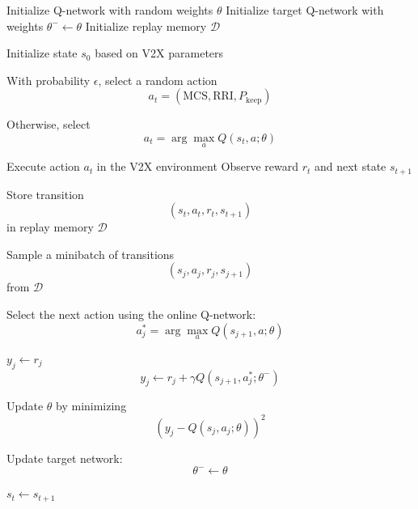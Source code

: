 \begin{algorithm}[H]
\caption{Double Deep Q-Learning for Adaptive Resource Allocation in NR-V2X}
\label{alg:ddqn_nrv2x}
\begin{algorithmic}[1]

\State Initialize Q-network with random weights $\theta$
\State Initialize target Q-network with weights $\theta^{-} \gets \theta$
\State Initialize replay memory $\mathcal{D}$


    \State Initialize state $s_0$ based on V2X parameters


        \State With probability $\epsilon$, select a random action
        \[
        a_t = (\mathrm{MCS},\mathrm{RRI},P_{\mathrm{keep}})
        \]

        \State Otherwise, select
        \[
        a_t =
        \arg\max_{a}
        Q(s_t,a;\theta)
        \]

        \State Execute action $a_t$ in the V2X environment
        \State Observe reward $r_t$ and next state $s_{t+1}$

        \State Store transition
        \[
        (s_t,a_t,r_t,s_{t+1})
        \]
        in replay memory $\mathcal{D}$

        \State Sample a minibatch of transitions
        \[
        (s_j,a_j,r_j,s_{j+1})
        \]
        from $\mathcal{D}$

        \State Select the next action using the online Q-network:
        \[
        a_j^{*}
        =
        \arg\max_{a}
        Q(s_{j+1},a;\theta)
        \]

            \State $y_j \gets r_j$
        \Else
            \State
            \[
            y_j
            \gets
            r_j
            +
            \gamma
            Q(s_{j+1},a_j^{*};\theta^{-})
            \]
        \EndIf

        \State Update $\theta$ by minimizing
        \[
        \left(
        y_j-Q(s_j,a_j;\theta)
        \right)^2
        \]

            \State Update target network:
            \[
            \theta^{-} \gets \theta
            \]
        \EndIf

        \State $s_t \gets s_{t+1}$

    \EndFor

\EndFor

\end{algorithmic}
\end{algorithm}

